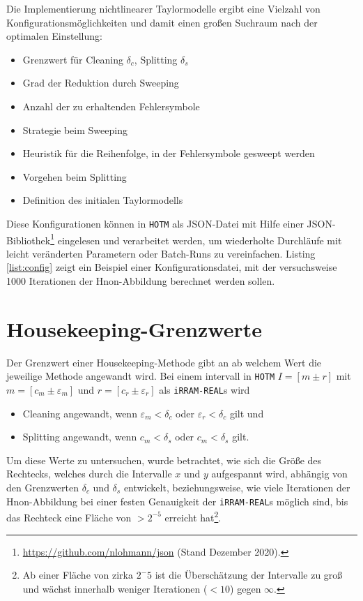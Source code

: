 Die Implementierung nichtlinearer Taylormodelle ergibt eine Vielzahl von Konfigurationsmöglichkeiten und damit einen großen Suchraum nach der optimalen Einstellung:
\begin{itemize}
 \item Grenzwert für Cleaning $\delta_c$, Splitting $\delta_s$
 \item Grad der Reduktion durch Sweeping
 \item Anzahl der zu erhaltenden Fehlersymbole
 \item Strategie beim Sweeping
 \item Heuristik für die Reihenfolge, in der Fehlersymbole gesweept werden
 \item Vorgehen beim Splitting
 \item Definition des initialen Taylormodells
\end{itemize}
Diese Konfigurationen können in \verb+HOTM+ als JSON-Datei mit Hilfe einer JSON-Bibliothek\footnote{\url{https://github.com/nlohmann/json} (Stand Dezember 2020).} eingelesen und verarbeitet werden, um wiederholte Durchläufe mit leicht veränderten Parametern oder Batch-Runs zu vereinfachen. Listing \ref{list:config} zeigt ein Beispiel einer Konfigurationsdatei, mit der versuchsweise 1000 Iterationen der H\e non-Abbildung berechnet werden sollen. 



\section{Housekeeping-Grenzwerte}
Der Grenzwert einer Housekeeping-Methode gibt an ab welchem Wert die jeweilige Methode angewandt wird. Bei einem intervall in \verb+HOTM+ $I=[m \pm r]$ mit $m = [c_m \pm \varepsilon_m]$ und $r = [c_r \pm \varepsilon_r]$ als \verb+iRRAM-REAL+s wird
\begin{itemize}
 \item Cleaning angewandt, wenn $\varepsilon_m < \delta_c$ oder $\varepsilon_r < \delta_c$ gilt und
 \item Splitting angewandt, wenn $c_m < \delta_s$ oder $c_m < \delta_s$ gilt.
\end{itemize}
Um diese Werte zu untersuchen, wurde betrachtet, wie sich die Größe des Rechtecks, welches durch die Intervalle $x$ und $y$ aufgespannt wird, abhängig von den Grenzwerten $\delta_c$ und $\delta_s$ entwickelt, beziehungsweise, wie viele Iterationen der H\e non-Abbildung bei einer festen Genauigkeit der \verb+iRRAM-REAL+s möglich sind, bis das Rechteck eine Fläche von $>2^{-5}$ erreicht hat\footnote{Ab einer Fläche von zirka $2^-{5}$ ist die Überschätzung der Intervalle zu groß und wächst innerhalb weniger Iterationen ($< 10$) gegen $\infty$.}.


